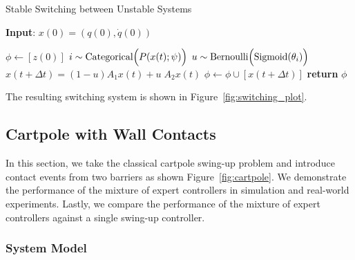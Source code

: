 \begin{algorithm}
      \caption{Stable Switching between Unstable Systems}
      \label{algo:switching_A1A2}
      \small
      \hspace*{\algorithmicindent} \textbf{Input}: $x(0) = (q(0), \dot{q}(0))$
      \begin{algorithmic}[1]
        \State $\phi \leftarrow  [z(0)]$ 
              \State $i \sim \text{Categorical}\Bigl(P(x(t); \psi)\Bigr)$ 
              \State $u \sim \text{Bernoulli} \Bigl(\textrm{Sigmoid}(\theta_i) \Bigr)$      
              \State $x(t+\Delta t) = (1-u)A_1x(t) + u \; A_2x(t) $
              \State $\phi \leftarrow \phi \cup [x(t+\Delta t)]$
            \EndFor
          \State \textbf{return} $\phi$
      \end{algorithmic}
  \end{algorithm}
  
The resulting switching system is shown in Figure~\ref{fig:switching_plot}.

\subsection{Cartpole with Wall Contacts}
\label{ssec:cartpole_with_walls}

In this section, we take the classical cartpole swing-up problem and introduce
contact events from two barriers as shown Figure~\ref{fig:cartpole}. 
%
We demonstrate the performance of the mixture of expert controllers in
simulation and real-world experiments.
%
Lastly, we compare the performance of the mixture of expert controllers against
a single swing-up controller. 


\subsubsection{System Model}
\label{sssec:cartpole_model}

